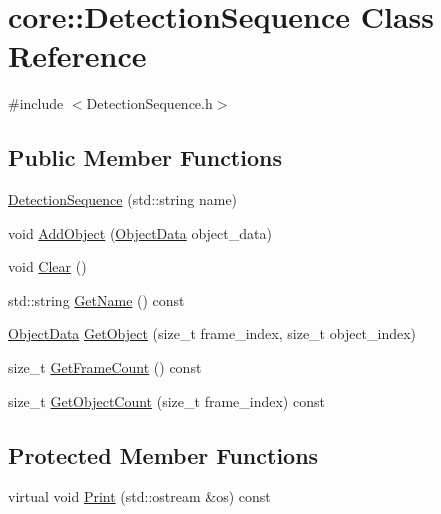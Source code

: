 \hypertarget{classcore_1_1DetectionSequence}{}\section{core\+:\+:Detection\+Sequence Class Reference}
\label{classcore_1_1DetectionSequence}


{\ttfamily \#include $<$Detection\+Sequence.\+h$>$}

\subsection*{Public Member Functions}
\begin{DoxyCompactItemize}
\item 
\hyperlink{classcore_1_1DetectionSequence_ad2183e28df5cb27883d396dfa3b40b6a}{Detection\+Sequence} (std\+::string name)
\item 
void \hyperlink{classcore_1_1DetectionSequence_a933757fe1f1093ac4be0d9be9a79d394}{Add\+Object} (\hyperlink{classcore_1_1ObjectData}{Object\+Data} object\+\_\+data)
\item 
void \hyperlink{classcore_1_1DetectionSequence_ab62569a3e51d58457057deba12ef6892}{Clear} ()
\item 
std\+::string \hyperlink{classcore_1_1DetectionSequence_a8a1af3dee89766d06f4a4f74044082ad}{Get\+Name} () const
\item 
\hyperlink{classcore_1_1ObjectData}{Object\+Data} \hyperlink{classcore_1_1DetectionSequence_a8d562d3ea68249306825655efc703ee1}{Get\+Object} (size\+\_\+t frame\+\_\+index, size\+\_\+t object\+\_\+index)
\item 
size\+\_\+t \hyperlink{classcore_1_1DetectionSequence_a2417e4f2652a39245d6f2faa0ce19571}{Get\+Frame\+Count} () const
\item 
size\+\_\+t \hyperlink{classcore_1_1DetectionSequence_a99a1b693215c386c4716df12f6040100}{Get\+Object\+Count} (size\+\_\+t frame\+\_\+index) const
\end{DoxyCompactItemize}
\subsection*{Protected Member Functions}
\begin{DoxyCompactItemize}
\item 
virtual void \hyperlink{classcore_1_1DetectionSequence_ad8e771ebdcfe84a91da5eb71cb98a410}{Print} (std\+::ostream \&os) const
\end{DoxyCompactItemize}
